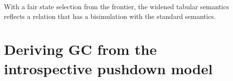 
\iftr{}

\begin{theorem}\label{thm:global}
  With a fair state selection from the frontier, the widened tabular semantics reflects a relation that has a bisimulation with the standard semantics.
\end{theorem}

\section{Deriving GC from the introspective pushdown model}\label{sec:gc}

